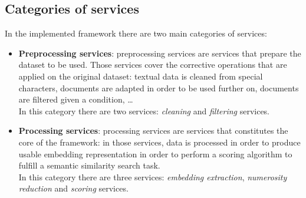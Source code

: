 \documentclass[\main/main.tex]{subfiles}
\begin{document}
\subsection{Categories of services}
In the implemented framework there are two main categories of services:
\begin{itemize}
    \item \textbf{Preprocessing services}: preprocessing services are services that prepare the dataset to be used. Those services cover the corrective operations that are applied on the original dataset: textual data is cleaned from special characters, documents are adapted in order to be used further on, documents are filtered given a condition, \dots  \\
    In this category there are two services: \textit{cleaning} and \textit{filtering} services.
    \item \textbf{Processing services}: processing services are services that constitutes the core of the framework: in those services, data is processed in order to produce usable embedding representation in order to perform a scoring algorithm to fulfill a semantic similarity search task. \\
    In this category there are three services: \textit{embedding extraction}, \textit{numerosity reduction} and \textit{scoring} services.
\end{itemize}
\end{document}
